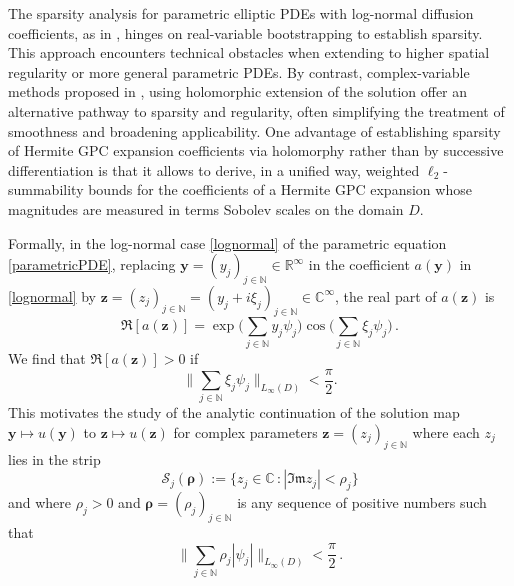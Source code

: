 \documentclass[11pt]{article}
\numberwithin{equation}{section}
\theoremstyle{definition}
\theoremstyle{remark}
\newcommand{\by}{{\boldsymbol{y}}}
\newcommand{\bz}{{\boldsymbol{z}}}
\newcommand{\brho}{{\boldsymbol{\rho}}}
\def\NN{{\mathbb N}}
\def\CC{{\mathbb C}}
\def\CC{{\mathbb C}}
\def\NN{{\mathbb N}}
\def\RRi{{\mathbb R}^\infty}
\def\CC{{\mathbb C}}
\def\NN{{\mathbb N}}
\begin{document}
{The sparsity analysis for parametric elliptic PDEs with log-normal diffusion coefficients, as in \cite{BCDC17, BCDM17}, hinges on real-variable bootstrapping to establish sparsity. This approach encounters technical obstacles when extending to higher spatial regularity or more general parametric PDEs. By contrast, complex-variable methods proposed in \cite{DNSZ2023}, using holomorphic extension of the solution offer an alternative pathway to sparsity and regularity, often simplifying the treatment of smoothness and broadening applicability.
One advantage of
establishing sparsity of Hermite GPC expansion coefficients via
holomorphy rather than by successive differentiation is that it allows
to derive, in a unified way, weighted $\ell_2$-summability bounds for the 
coefficients of a Hermite GPC expansion whose magnitudes are measured in terms
Sobolev scales on the domain $D$.

 
Formally, in the log-normal case \eqref{lognormal} of the parametric equation \eqref{parametricPDE},
replacing $\by=(y_j)_{j \in \NN}\in \RRi$ in the coefficient $a(\by)$ in \eqref{lognormal} by
$\bz=(z_j)_{j \in \NN}=(y_j+i \xi_j)_{j \in \NN}\in \CC^\infty$, 
the real part of $a(\bz)$ is
\begin{equation*} \label{Re(a)} \mathfrak{R}[a(\bz)] =
	\exp\Bigg({\sum_{j \in \NN} y_j\psi_j}\Bigg) \cos\Bigg(\sum_{j
		\in \NN} \xi_j\psi_j\Bigg)\,.
\end{equation*}
We find that $\mathfrak{R}[a(\bz)]>0$ if
$$
\bigg\|\sum_{j \in \NN} \xi_j\psi_j \bigg\|_{L_\infty(D)} <
\frac{\pi}{2}.
$$
 This motivates the study
of the analytic continuation of the solution map $\by \mapsto u(\by)$
to $\bz \mapsto u(\bz)$ for complex parameters
$\bz = (z_j)_{j \in \NN}$ where each
$z_j$ lies in the strip
\begin{equation} \label{eq:DefSjrho} 
	\mathcal{S}_j (\brho):= \{ z_j\in
	\CC\,: |\mathfrak{Im}z_j| < \rho_j\}
\end{equation}
and where $\rho_j>0$ and
$\brho=(\rho_j)_{j \in \NN}$ is any sequence of
positive numbers such that
\begin{equation*} \label{k-011} \Bigg\|\sum_{j\in \NN} \rho_j
	|\psi_j|\Bigg\|_{L_\infty(D)} < \frac{\pi}{2}\,.
\end{equation*} 


}
\end{document}
